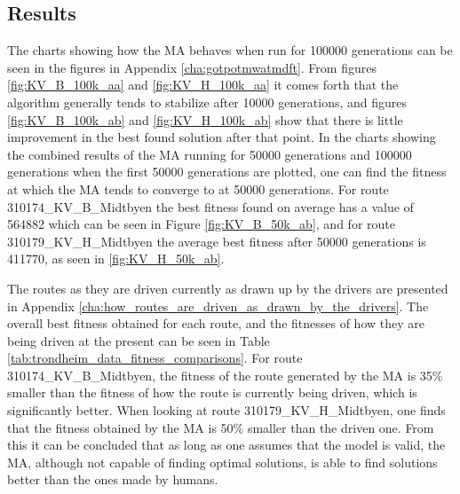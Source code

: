\subsection{Results}



The charts showing how the MA behaves when run for 100000 generations can be seen in the figures in Appendix \ref{cha:gotpotmwatmdft}. From figures \ref{fig:KV_B_100k_aa} and \ref{fig:KV_H_100k_aa} it comes forth that the algorithm generally tends to stabilize after 10000 generations, and figures \ref{fig:KV_B_100k_ab} and \ref{fig:KV_H_100k_ab} show that there is little improvement in the best found solution after that point. In the charts showing the combined results of the MA running for 50000 generations and 100000 generations when the first 50000 generations are plotted, one can find the fitness at which the MA tends to converge to at 50000 generations. For route 310174\_KV\_B\_Midtbyen the best fitness found on average has a value of 564882 which can be seen in Figure \ref{fig:KV_B_50k_ab}, and for route 310179\_KV\_H\_Midtbyen the average best fitness after 50000 generations is 411770, as seen in \ref{fig:KV_H_50k_ab}.

The routes as they are driven currently as drawn up by the drivers are presented in Appendix \ref{cha:how_routes_are_driven_as_drawn_by_the_drivers}. The overall best fitness obtained for each route, and the fitnesses of how they are being driven at the present can be seen in Table \ref{tab:trondheim_data_fitness_comparisons}. For route 310174\_KV\_B\_Midtbyen, the fitness of the route generated by the MA is 35\% smaller than the fitness of how the route is currently being driven, which is significantly better. When looking at route 310179\_KV\_H\_Midtbyen, one finds that the fitness obtained by the MA is 50\% smaller than the driven one. From this it can be concluded that as long as one assumes that the model is valid, the MA, although not capable of finding optimal solutions, is able to find solutions better than the ones made by humans.


